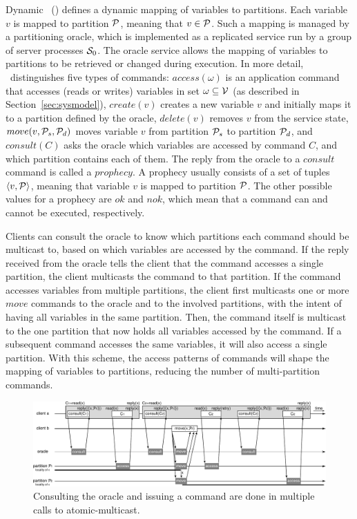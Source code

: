 Dynamic \ssmr\ (\dssmr) defines a dynamic mapping of variables to partitions.
Each variable $v$ is mapped to partition $\mathcal{P}$, meaning that $v \in \mathcal{P}$. Such
a mapping is managed by a partitioning oracle, which is implemented as a
replicated service run by a group of server processes $\mathcal{S}_0$. The oracle
service allows the mapping of variables to partitions to be retrieved or changed
during execution. In more detail, \dssmr\ distinguishes five types of commands:
$access(\omega)$ is an application command that accesses (reads or writes)
variables in set $\omega \subseteq \mathcal{V}$ (as described in
Section~\ref{sec:sysmodel}), $create(v)$ creates a new variable $v$ and
initially maps it to a partition defined by the oracle, $delete(v)$ removes $v$
from the service state,
$move(v,\mathcal{P}_s,\mathcal{P}_d)$ moves variable $v$ from partition $\mathcal{P}_s$ to partition
$\mathcal{P}_d$, and $consult(C)$ asks the oracle which variables are accessed by
command $C$, and which partition contains each of them. The reply from the
oracle to a $consult$ command is called a $prophecy$. A prophecy usually
consists of a set of tuples $\langle v, \mathcal{P} \rangle$, meaning that variable $v$
is mapped to partition $\mathcal{P}$. The other possible values for a prophecy are $ok$
and $nok$, which mean that a command can and cannot be executed, respectively.

Clients can consult the oracle to know which partitions each command should be
multicast to, based on which variables are accessed by the command. If the reply
received from the oracle tells the client that the command accesses a single
partition, the client multicasts the command to that partition. If the command
accesses variables from multiple partitions, the client first multicasts one or
more $move$ commands to the oracle and to the involved partitions, with the
intent of having all variables in the same partition. Then, the command itself
is multicast to the one partition that now holds all variables accessed by the
command. If a subsequent command accesses the same variables, it will also
access a single partition. With this scheme, the access patterns of commands
will shape the mapping of variables to partitions, reducing the number of
multi-partition commands.

\begin{figure}
\begin{minipage}[b]{1.0\linewidth} %
\centering
      \includegraphics[width=0.8\linewidth]{figures/move_case_1}
\end{minipage}
\caption{Consulting the oracle and issuing a command are done in multiple calls to atomic-multicast.}
\label{fig:move_case_1}
\end{figure}

